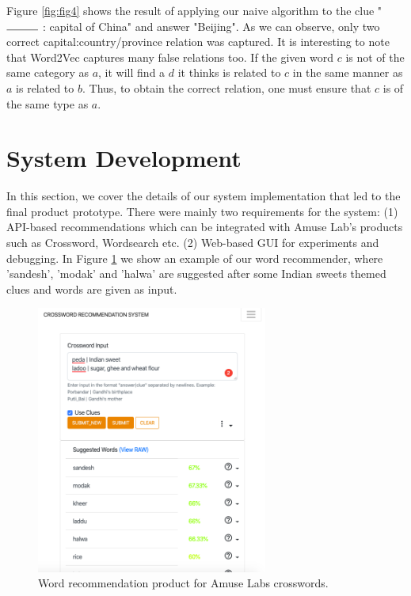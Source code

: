 \documentclass[twoside]{article}
\begin{document}
Figure \ref{fig:fig4} shows the result of applying our naive algorithm to the clue "$\rule{1cm}{0.15mm}$ : capital of China" and answer "Beijing". As we can observe, only two correct capital:country/province relation was captured. It is interesting to note that Word2Vec captures many false relations too. If the given word $c$ is not of the same category as $a$, it will find a $d$ it thinks is related to $c$ in the same manner as $a$ is related to $b$. Thus, to obtain the correct relation, one must ensure that $c$ is of the same type as $a$.

\section{System Development}
\label{sec:sec6}
In this section, we cover the details of our system implementation that led to the final product prototype. There were mainly two requirements for the system: (1) API-based recommendations which can be integrated with Amuse Lab's products such as Crossword, Wordsearch etc. (2) Web-based GUI for experiments and debugging. In Figure \ref{fig:fig3} we show an example of our word recommender, where 'sandesh', 'modak' and 'halwa' are suggested after some Indian sweets themed clues and words are given as input.

\begin{figure}
  \centering
  \includegraphics[height=250pt]{images/sweet_example.png}
  \caption{Word recommendation product for Amuse Labs crosswords.}
  \label{fig:fig3}
\end{figure}
\end{document}

